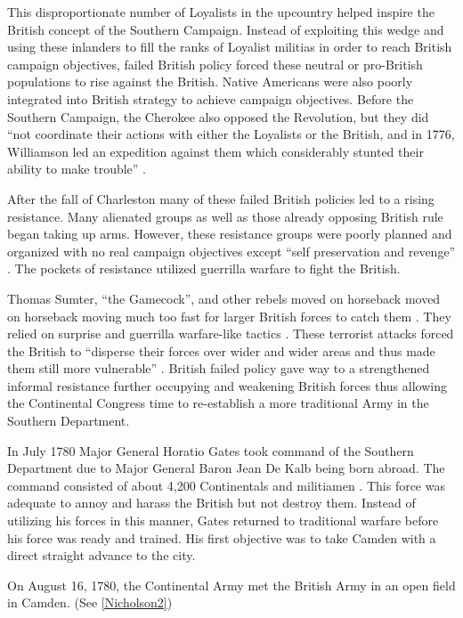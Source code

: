 This disproportionate number of Loyalists in the upcountry helped inspire the
British concept of the Southern Campaign.  Instead of exploiting this wedge and
using these inlanders to fill the ranks of Loyalist militias in order to reach
British campaign objectives, failed British policy forced these neutral or
pro-British populations to rise against the British.  Native Americans were also
poorly integrated into British strategy to achieve campaign objectives.  Before
the Southern Campaign, the Cherokee also opposed the Revolution, but they did
“not coordinate their actions with either the Loyalists or the British, and in
1776, Williamson led an expedition against them which considerably stunted their
ability to make trouble” \cite[p.12]{weigley_partisan_1970}.

After the fall of Charleston many of these failed British policies led to a
rising resistance.  Many alienated groups as well as those already opposing
British rule began taking up arms.  However, these resistance groups were poorly
planned and organized with no real campaign objectives except  “self
preservation and revenge” \cite[p.14]{weigley_partisan_1970}.  The pockets of resistance utilized
guerrilla warfare to fight the British.  

Thomas Sumter, “the Gamecock”, and other rebels moved on horseback moved on
horseback moving much too fast for larger British forces to catch them
\cite[p.15]{weigley_partisan_1970}.  They relied on surprise and guerrilla warfare-like tactics
\cite[p.15]{weigley_partisan_1970}.  These terrorist attacks forced the British to “disperse
their forces over wider and wider areas and thus made them still more
vulnerable” \cite[p.16]{weigley_partisan_1970}.  British failed policy gave way to a
strengthened informal resistance further occupying and weakening British forces
thus allowing the Continental Congress time to re-establish a more traditional
Army in the Southern
Department.

In July 1780 Major General Horatio Gates took command of the Southern Department
due to Major General Baron Jean De Kalb being born abroad.  The command
consisted of about 4,200 Continentals and militiamen \cite[p.21]{moncure_cowpens_1996}.  This
force was adequate to annoy and harass the British but not destroy them.
Instead of utilizing his forces in this manner, Gates returned to traditional
warfare before his force was ready and trained.  His first objective was to take
Camden with a direct straight advance to the city. 

On August 16, 1780, the Continental Army met the British Army in an open field
in Camden. (See \ref{Nicholson2})

